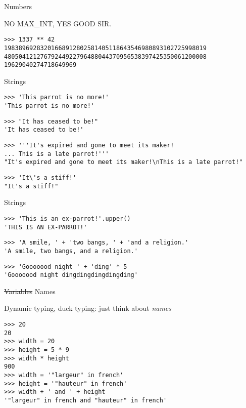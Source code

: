 \documentclass[ignorenonframetext,]{beamer}
\begin{document}
\begin{frame}[fragile]{Numbers}

    NO MAX\_INT, YES GOOD SIR.

    \begin{verbatim}
>>> 1337 ** 42
19838969283201668912802581405118643546980893102725998019
48050412127679244922796488044370956538397425350061200008
19629040274718649969
    \end{verbatim}
\end{frame}

\begin{frame}[fragile]{Strings}
    \begin{verbatim}
>>> 'This parrot is no more!'
'This parrot is no more!'
    \end{verbatim}

    \pause
    \begin{verbatim}
>>> "It has ceased to be!"
'It has ceased to be!'
    \end{verbatim}

    \pause
    \begin{verbatim}
>>> '''It's expired and gone to meet its maker!
... This is a late parrot!'''
"It's expired and gone to meet its maker!\nThis is a late parrot!"
    \end{verbatim}

    \pause
    \begin{verbatim}
>>> 'It\'s a stiff!'
"It's a stiff!"
    \end{verbatim}
\end{frame}

\begin{frame}[fragile]{Strings}
    \begin{verbatim}
>>> 'This is an ex-parrot!'.upper()
'THIS IS AN EX-PARROT!'
    \end{verbatim}

    \pause
    \begin{verbatim}
>>> 'A smile, ' + 'two bangs, ' + 'and a religion.'
'A smile, two bangs, and a religion.'
    \end{verbatim}

    \pause
    \begin{verbatim}
>>> 'Gooooood night ' + 'ding' * 5
'Gooooood night dingdingdingdingding'
    \end{verbatim}
\end{frame}

\begin{frame}[fragile]{\st{Variables} Names}

    Dynamic typing, duck typing: just think about \emph{names}

    \begin{verbatim}
>>> 20
20
>>> width = 20
>>> height = 5 * 9
>>> width * height
900
>>> width = '"largeur" in french'
>>> height = '"hauteur" in french'
>>> width + ' and ' + height
'"largeur" in french and "hauteur" in french'
    \end{verbatim}
\end{frame}
\end{document}
